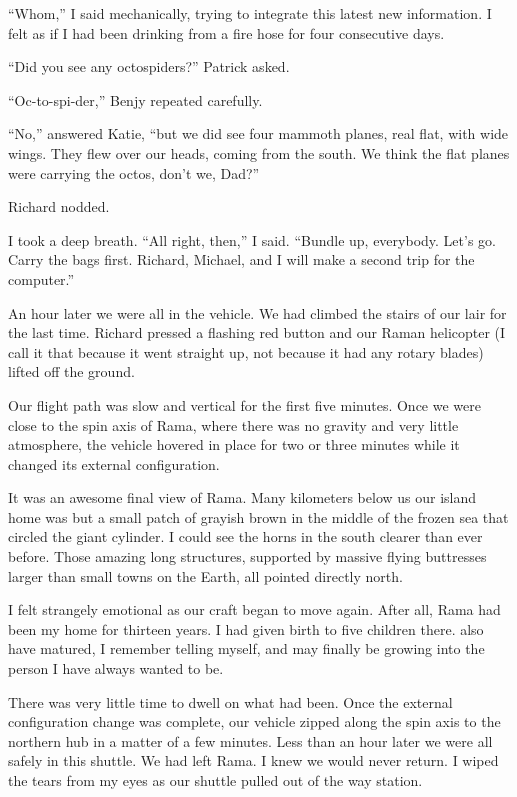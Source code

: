 \documentclass[]{article}
\begin{document}
{“Whom,” I said mechanically, trying to integrate this latest new information.  I felt as if I had been drinking from a fire hose for four consecutive days.

“Did you see any octospiders?” Patrick asked.

“Oc-to-spi-der,” Benjy repeated carefully.

“No,” answered Katie, “but we did see four mammoth planes, real flat, with wide wings.  They flew over our heads, coming from the south.  We think the flat planes were carrying the octos, don’t we, Dad?”

Richard nodded.

I took a deep breath.  “All right, then,” I said.  “Bundle up, everybody.  Let’s go.  Carry the bags first.  Richard, Michael, and I will make a second trip for the computer.”

An hour later we were all in the vehicle.  We had climbed the stairs of our lair for the last time.  Richard pressed a flashing red button and our Raman helicopter (I call it that because it went straight up, not because it had any rotary blades) lifted off the ground.

Our flight path was slow and vertical for the first five minutes.  Once we were close to the spin axis of Rama, where there was no gravity and very little atmosphere, the vehicle hovered in place for two or three minutes while it changed its external configuration.

It was an awesome final view of Rama.  Many kilometers below us our island home was but a small patch of grayish brown in the middle of the frozen sea that circled the giant cylinder.  I could see the horns in the south clearer than ever before.  Those amazing long structures, supported by massive flying buttresses larger than small towns on the Earth, all pointed directly north.

I felt strangely emotional as our craft began to move again.  After all, Rama had been my home for thirteen years.  I had given birth to five children there.  also have matured, I remember telling myself, and may finally be growing into the person I have always wanted to be.

There was very little time to dwell on what had been.  Once the external configuration change was complete, our vehicle zipped along the spin axis to the northern hub in a matter of a few minutes.  Less than an hour later we were all safely in this shuttle.  We had left Rama.  I knew we would never return.  I wiped the tears from my eyes as our shuttle pulled out of the way station.


}
\end{document}
